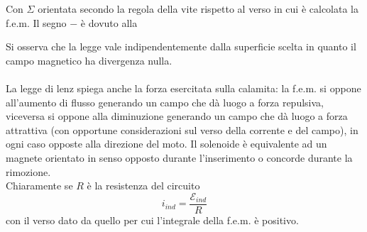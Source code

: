 
Con $\Sigma$ orientata secondo la regola della vite rispetto al verso in cui è calcolata la f.e.m. Il segno $-$ è dovuto alla


Si osserva che la legge vale indipendentemente dalla superficie scelta in quanto il campo magnetico ha divergenza nulla.
\\~\\
La legge di lenz spiega anche la forza esercitata sulla calamita: la f.e.m. si oppone all'aumento di flusso generando un campo che dà luogo a forza repulsiva, viceversa si oppone alla diminuzione generando un campo che dà luogo a forza attrattiva (con opportune considerazioni sul verso della corrente e del campo), in ogni caso opposte alla direzione del moto. Il solenoide è equivalente ad un magnete orientato in senso opposto durante l'inserimento o concorde durante la rimozione.
\\Chiaramente se $R$ è la resistenza del circuito
\[i_{ind} = \frac{\mathcal{E}_{ind}}{R}\]
con il verso dato da quello per cui l'integrale della f.e.m. è positivo.

